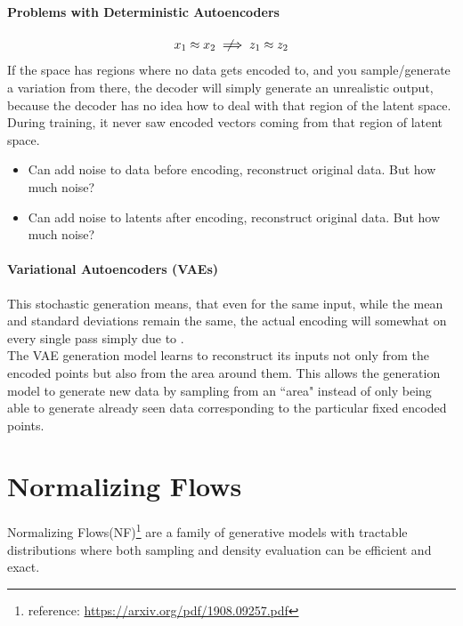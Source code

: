 \documentclass[11pt]{article}
\begin{document}
\paragraph{Problems with Deterministic Autoencoders}
$$x_1 \approx x_2 \notimplies z_1 \approx z_2$$
If the space has regions where no data gets encoded to, and you sample/generate a variation from there, the decoder will simply generate an unrealistic output, because the decoder has no idea how to deal with that region of the latent space. During training, it never saw encoded vectors coming from that region of latent space.\\
\begin{itemize}
	\item Can add noise to data before encoding, reconstruct original data. But how much noise? 
	\item Can add noise to latents after encoding, reconstruct original data. But how much noise?
\end{itemize}

\paragraph{Variational Autoencoders (VAEs)}
This stochastic generation means, that even for the same input, while the mean and standard deviations remain the same, the actual encoding will somewhat  on every single pass simply due to . \\
The VAE generation model learns to reconstruct its inputs not only from the encoded points but also from the area around them. This allows the generation model to generate new data by sampling from an ``area" instead of only being able to generate already seen data corresponding to the particular fixed encoded points.

\section{Normalizing Flows}
Normalizing Flows(NF)\footnote{reference: \url{https://arxiv.org/pdf/1908.09257.pdf}} are a family of generative models with tractable distributions where both sampling and density evaluation can be efficient and exact.
\end{document}
